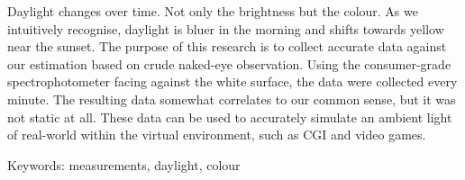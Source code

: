 Daylight changes over time. Not only the brightness but the colour. As we intuitively recognise, daylight is bluer in the morning and shifts towards yellow near the sunset. The purpose of this research is to collect accurate data against our estimation based on crude naked-eye observation. Using the consumer-grade spectrophotometer facing against the white surface, the data were collected every minute. The resulting data somewhat correlates to our common sense, but it was not static at all. These data can be used to accurately simulate an ambient light of real-world within the virtual environment, such as CGI and video games.

Keywords: measurements, daylight, colour
